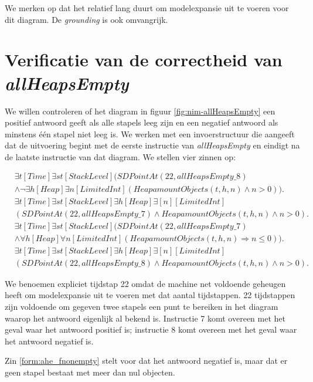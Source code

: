We merken op dat het relatief lang duurt om modelexpansie uit te voeren voor dit diagram. De \textit{grounding} is ook omvangrijk.

\section{Verificatie van de correctheid van \textit{allHeapsEmpty}}

We willen controleren of het diagram in figuur \ref{fig:nim-allHeapsEmpty} een positief antwoord geeft als alle stapels leeg zijn en een negatief antwoord als minstens \'e\'en stapel niet leeg is. We werken met een invoerstructuur die aangeeft dat de uitvoering begint met de eerste instructie van \textit{allHeapsEmpty} en eindigt na de laatste instructie van dat diagram. We stellen vier zinnen op:

\begin{align}
	\nonumber&\exists{t}[Time]\exists{st}[StackLevel](SDPointAt(22, allHeapsEmpty\_8) \\ &\land \lnot\exists{h}[Heap]\exists{n}[LimitedInt](HeapamountObjects(t, h, n) \land n > 0)).\label{form:ahe_fnonempty} \\
	\nonumber&\exists{t}[Time]\exists{st}[StackLevel]\exists{h}[Heap]\exists[n][LimitedInt] \\ &(SDPointAt(22, allHeapsEmpty\_7) \land HeapamountObjects(t, h, n) \land n > 0).\label{form:ahe_fempty} \\
	\nonumber&\exists{t}[Time]\exists{st}[StackLevel](SDPointAt(22, allHeapsEmpty\_7) \\ &\land \forall{h}[Heap]\forall{n}[LimitedInt](HeapamountObjects(t, h, n) \Rightarrow n \leq 0)).\label{form:ahe_cempty} \\
	\nonumber&\exists{t}[Time]\exists{st}[StackLevel]\exists{h}[Heap]\exists[n][LimitedInt] \\ &(SDPointAt(22, allHeapsEmpty\_8) \land HeapamountObjects(t, h, n) \land n > 0).\label{form:ahe_cnonempty}
\end{align}

We benoemen expliciet tijdstap 22 omdat de machine net voldoende geheugen heeft om modelexpansie uit te voeren met dat aantal tijdstappen. 22 tijdstappen zijn voldoende om gegeven twee stapels een punt te bereiken in het diagram waarop het antwoord eigenlijk al bekend is. Instructie 7 komt overeen met het geval waar het antwoord positief is; instructie 8 komt overeen met het geval waar het antwoord negatief is.

Zin \ref{form:ahe_fnonempty} stelt voor dat het antwoord negatief is, maar dat er geen stapel bestaat met meer dan nul objecten.

